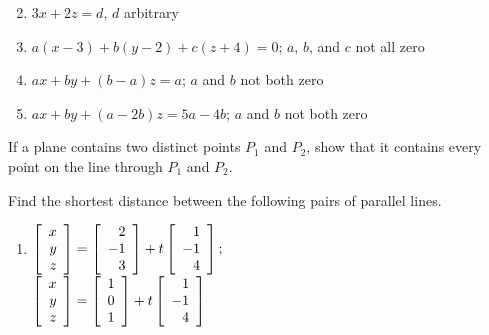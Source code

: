\begin{multicols}{2}
\begin{ex}
\begin{enumerate}[label={\alph*.}]
\end{enumerate}
\begin{sol}
\begin{enumerate}[label={\alph*.}]
\setcounter{enumi}{1}
\item  $3x + 2z = d$, $d$ arbitrary

\setcounter{enumi}{3}
\item  $a(x - 3) + b(y - 2) + c(z + 4) = 0$; $a$, $b$, and $c$ not all zero

\setcounter{enumi}{5}
\item  $ax + by + (b - a)z = a$; $a$ and $b$ not both zero

\setcounter{enumi}{7}
\item $ax + by + (a - 2b)z = 5a - 4b$; $a$ and $b$ not both zero

\end{enumerate}
\end{sol}
\end{ex}

\begin{ex}
If a plane contains two distinct points $P_{1}$ and $P_{2}$, show that it contains every point on the line through $P_{1}$ and $P_{2}$.
\end{ex}

\begin{ex}
Find the shortest distance between the following pairs of parallel lines.

\begin{enumerate}[label={\alph*.}]
\item $\left[
\begin{array}{r}
x\\
y\\
z
\end{array}
\right]
=
\left[
\begin{array}{r}
2\\
-1\\
3
\end{array}
\right]
+t
\left[
\begin{array}{r}
1\\
-1\\
4
\end{array}
\right]; $ \\ $
\left[
\begin{array}{r}
x\\
y\\
z
\end{array}
\right]
=
\left[
\begin{array}{r}
1\\
0\\
1
\end{array}
\right]
+t
\left[
\begin{array}{r}
1\\
-1\\
4
\end{array}
\right]$


\end{enumerate}
\end{ex}
\end{multicols}
